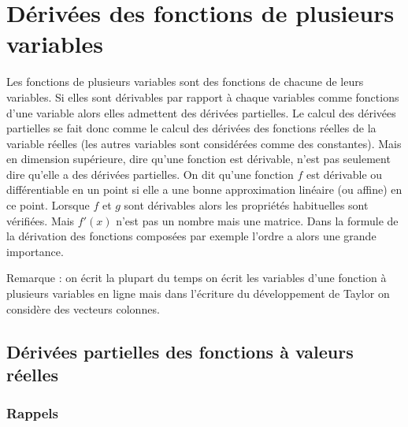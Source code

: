 \documentclass[class=report,crop=false]{standalone}
\begin{document}
\newpage
\section{ Dérivées des fonctions de plusieurs variables}

Les fonctions de plusieurs variables sont des fonctions de chacune de leurs variables. Si elles sont dérivables par rapport \`a chaque variables comme fonctions d'une variable alors  elles admettent des dérivées partielles. 
Le calcul des dérivées partielles se fait donc comme le calcul des dérivées des fonctions réelles de la variable réelles (les autres variables sont considérées comme des constantes).
Mais en dimension supérieure, dire qu'une fonction est dérivable, n'est pas seulement dire qu'elle a des dérivées partielles. On dit qu'une fonction $f$ est dérivable ou différentiable en un point si elle a une bonne approximation linéaire (ou affine) en ce point.
Lorsque $f$ et $g$ sont dérivables alors les propriétés habituelles sont vérifiées. Mais $f'(x)$ n'est pas un nombre mais une matrice. Dans la formule de la dérivation des fonctions composées par exemple l'ordre a alors une grande importance.

Remarque : on écrit la plupart du temps on écrit les variables d'une fonction \`a plusieurs variables en ligne mais dans l'écriture du développement de Taylor on consid\`ere des vecteurs colonnes. 

\subsection{Dérivées partielles des fonctions \`a valeurs réelles}



\subsubsection{Rappels}
\end{document}
